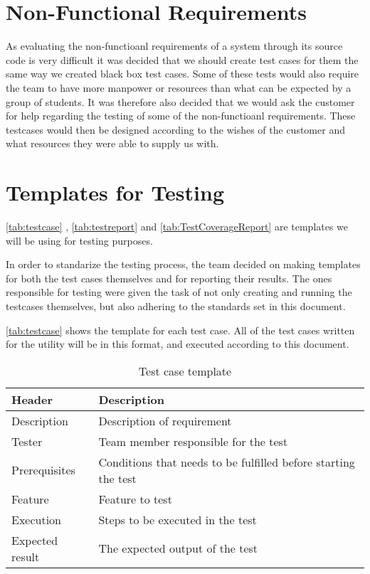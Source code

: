 \section{Non-Functional Requirements}
As evaluating the non-functioanl requirements of a system through its source code is very difficult it was decided that we should create test cases for them the same way we created black box test cases. Some of these tests would also require the team to have more manpower or resources than what can be expected by a group of students. It was therefore also decided that we would ask the customer for help regarding the testing of some of the non-functioanl requirements. These testcases would then be designed according to the wishes of the customer and what resources they were able to supply us with.

\section{Templates for Testing}
\autoref{tab:testcase} , \autoref{tab:testreport} and \autoref{tab:TestCoverageReport} are templates we will be
using for testing purposes.

In order to standarize the testing process, the team decided on making templates for both the test cases themselves and for reporting their results. The ones responsible for testing were given the task of not only creating and running the testcases themselves, but also adhering to the standards set in this document.

\autoref{tab:testcase} shows the template for each test case. All of the test cases written for the \gls{utility} will be in this format, and executed according to this document.

\begin{table}[htb] \small \center
\caption{Test case template \label{tab:testcase}}
\begin{tabular}{l l}
	\toprule
	Header & Description \\
	\midrule
	Description & Description of requirement \\
	Tester & Team member responsible for the test \\
	Prerequisites & Conditions that needs to be fulfilled before starting the test \\
	Feature & Feature to test \\
	Execution & Steps to be executed in the test \\
	Expected result & The expected output of the test \\
	\bottomrule
\end{tabular}
\end{table}


